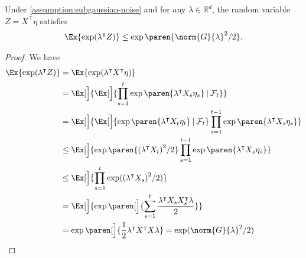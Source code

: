 \documentclass{article}
\newcommand{\Real}{\mathds{R}}
\newcommand\given[1][\delimsize]{%
  \providecommand{\delimsize}{}
  \nonscript\:#1\vert\allowbreak\nonscript\:\mathopen{}
}
\DeclarePairedDelimiter{\paren}()
\newcommand{\transp}[1]{#1^\intercal}
\begin{document}
\begin{lemma}\label{lemma:subgaussian-z}
  Under \cref{assumption:subgaussian-noise} and for any
$\lambda\in\Real^d$, the random variable $Z = \transp{X}\eta$ satisfies
  \begin{align*}
    \Ex{\exp(\transp{\lambda}Z)} \le \exp\paren{\norm{G}{\lambda}^2/2}.
  \end{align*}

  \begin{proof}
    We have
    \begin{align*}
      \Ex{\exp(\transp{\lambda}Z)}
      &= \Ex{\exp(\transp{\lambda}\transp{X}\eta)} \\
      &= \Ex[\Big]{\Ex[\Big]{\prod_{s=1}^t \exp\paren{\transp{\lambda}X_s\eta_s} \given \mathcal{F}_t}} \\
      &= \Ex[\Big]{\Ex[\Big]{\exp\paren{\transp{\lambda}X_t\eta_t} \given \mathcal{F}_t} \prod_{s=1}^{t-1} \exp\paren{\transp{\lambda}X_s\eta_s}} \\
      &\le \Ex[\Big]{\exp\paren{{(\transp{\lambda}X_t)}^2/2} \prod_{s=1}^{t-1} \exp\paren{\transp{\lambda}X_s\eta_s}} \\
      &\le \Ex[\Big]{\prod_{s=1}^t\exp({(\transp{\lambda}X_s)}^2/2)} \\
      &= \Ex[\Big]{\exp\paren[\Big]{\sum_{s=1}^t\frac{\transp{\lambda}X_s\transp{X_s}\lambda}{2}}} \\
      &= \exp\paren[\Big]{\frac{1}{2}\transp{\lambda}\transp{X}X\lambda}
        = \exp(\norm{G}{\lambda}^2/2)
        \qedhere
    \end{align*}
  \end{proof}
\end{lemma}
\end{document}
